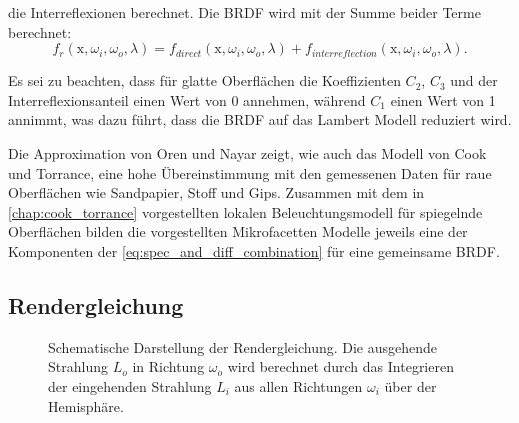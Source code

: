 \documentclass[thesis.tex]{subfiles}
\begin{document}
die Interreflexionen berechnet. Die BRDF wird mit der Summe beider Terme berechnet:
\begin{equation}
f_r(\mathrm{x}, \omega_i, \omega_o, \lambda) = f_{direct}(\mathrm{x}, \omega_i, \omega_o, \lambda) + f_{interreflection}(\mathrm{x}, \omega_i, \omega_o, \lambda).
\label{eq:OrenNayar_full}
\end{equation}

Es sei zu beachten, dass für glatte Oberflächen die Koeffizienten $C_2$, $C_3$ und der Interreflexionsanteil einen Wert von 0 annehmen, während $C_1$ einen Wert von 1 annimmt, was dazu führt, dass die BRDF auf das Lambert Modell reduziert wird. 

Die Approximation von Oren und Nayar zeigt, wie auch das Modell von Cook und Torrance, eine hohe Übereinstimmung mit den gemessenen Daten für raue Oberflächen wie Sandpapier, Stoff und Gips. Zusammen mit dem in \autoref{chap:cook_torrance} vorgestellten lokalen Beleuchtungsmodell für spiegelnde Oberflächen bilden die vorgestellten Mikrofacetten Modelle jeweils eine der Komponenten der \autoref{eq:spec_and_diff_combination} für eine gemeinsame BRDF.

\subsection{Rendergleichung}\label{sec:rendering_equation}

\begin{figure}[ht]
    \centering
    \caption{Schematische Darstellung der Rendergleichung. Die ausgehende Strahlung $L_o$ in Richtung $\omega_o$ wird berechnet durch das Integrieren der eingehenden Strahlung $L_i$ aus allen Richtungen $\omega_i$ über der Hemisphäre.}
    \label{fig:rendering_equation}
\end{figure}
\end{document}
